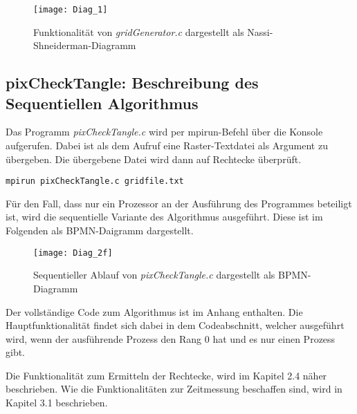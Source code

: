 \documentclass[
10pt, %
a4paper, %
oneside, %
headinclude,footinclude, %
BCOR5mm, %
]{scrartcl}
\begin{document}
\begin{figure}[h]
	\centering 
	\texttt{[image: Diag\_1]} 
	\caption[Funktionalität von \textit{gridGenerator.c}]{Funktionalität von \textit{gridGenerator.c} dargestellt als Nassi-Shneiderman-Diagramm}
\end{figure}


\subsection{pixCheckTangle: Beschreibung des Sequentiellen Algorithmus}

Das Programm \textit{pixCheckTangle.c} wird per mpirun-Befehl über die Konsole aufgerufen. Dabei ist als dem Aufruf eine Raster-Textdatei als Argument zu übergeben. Die übergebene Datei wird dann auf Rechtecke überprüft.\\

\begin{lstlisting}
mpirun pixCheckTangle.c gridfile.txt
\end{lstlisting}

Für den Fall, dass nur ein Prozessor an der Ausführung des Programmes beteiligt ist, wird die sequentielle Variante des Algorithmus ausgeführt. Diese ist im Folgenden als BPMN-Daigramm dargestellt.

\begin{figure}[h]
	\centering 
	\texttt{[image: Diag\_2f]} 
	\caption[Funktionalität von \textit{pixCheckTangle.c} sequentiell]{Sequentieller Ablauf von \textit{pixCheckTangle.c} dargestellt als BPMN-Diagramm }
	
\end{figure}

Der vollständige Code zum Algorithmus ist im Anhang enthalten. Die Hauptfunktionalität findet sich dabei in dem Codeabschnitt, welcher ausgeführt wird,   wenn der ausführende Prozess den Rang 0 hat und es nur einen Prozess gibt.
%
%
%
%	


Die Funktionalität zum Ermitteln der Rechtecke, wird im Kapitel 2.4 näher beschrieben. Wie die Funktionalitäten zur Zeitmessung beschaffen sind, wird in Kapitel 3.1 beschrieben.
\end{document}
